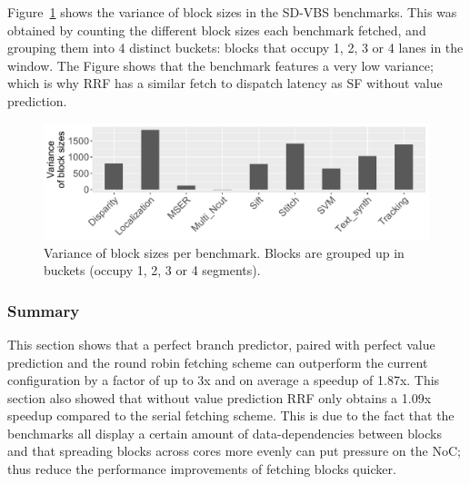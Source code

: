 Figure~\ref{fig:variance} shows the variance of block sizes in the SD-VBS benchmarks.
This was obtained by counting the different block sizes each benchmark fetched, and grouping them into 4 distinct buckets: blocks that occupy 1, 2, 3 or 4 lanes in the window.
The Figure shows that the benchmark  features a very low variance; which is why RRF has a similar fetch to dispatch latency as SF without value prediction.


\begin{figure}[t]
    \centering
    \includegraphics[width=1\textwidth]{chapter3/graphics/variance.pdf}
    \caption{Variance of block sizes per benchmark. Blocks are grouped up in buckets (occupy 1, 2, 3 or 4 segments).}
    \label{fig:variance}
	\vspace{1em}
\end{figure}


\subsubsection{Summary}

This section shows that a perfect branch predictor, paired with perfect value prediction and the round robin fetching scheme can outperform the current configuration by a factor of up to 3x and on average a speedup of 1.87x.%
This section also showed that without value prediction RRF only obtains a 1.09x speedup compared to the serial fetching scheme.
This is due to the fact that the benchmarks all display a certain amount of data-dependencies between blocks and that spreading blocks across cores more evenly can put pressure on the NoC; thus reduce the performance improvements of fetching blocks quicker.

